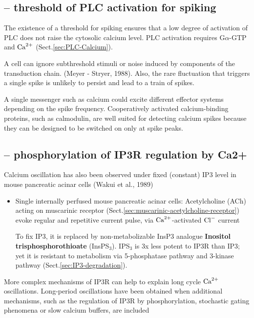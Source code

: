 \subsection{-- threshold of PLC activation for spiking}

The existence of a threshold for spiking ensures that a low degree of activation
of PLC does not raise the cytosolic calcium level.
PLC activation requires G$\alpha$-GTP and ${\text{Ca}^{2+}}$ (Sect.\ref{sec:PLC-Calcium}).

A cell can ignore subthreshold stimuli or noise induced by components of the
transduction chain. (Meyer - Stryer, 1988). Also, the rare fluctuation that
triggers a single spike is unlikely to persist and lead to a train of spikes.

A single messenger such as calcium could excite different effector systems
depending on the spike frequency. Cooperatively activated calcium-binding
proteins, such as calmodulin, are well suited for detecting calcium spikes
because they can be designed to be switched on only at spike peaks.




\subsection{-- phosphorylation of IP3R regulation by Ca2+}

Calcium oscillation has also been observed under fixed (constant) IP3 level
in mouse pancreatic acinar cells (Wakui et al., 1989)
\begin{itemize}
  \item Single internally perfused mouse pancreatic acinar cells: Acetylcholine
  (ACh) acting on muscarinic receptor
  (Sect.\ref{sec:muscarinic-acetylcholine-receptor}) evoke regular and
  repetitive current pulse, via ${\text{Ca}^{2+}}$-activated ${\text{Cl}^{-}}$ current
  
  To fix IP3, it is replaced by non-metabolizable InsP3 analogue {\bf Inositol
  trisphosphorothioate} (InsPS$_3$). IPS$_3$ is 3x less potent to IP3R than IP3;
  yet it is resistant to metabolism via 5-phosphatase pathway and 3-kinase
  pathway (Sect.\ref{sec:IP3-degradation}).
\end{itemize}


More complex mechanisms of IP3R can help to explain long cycle ${\text{Ca}^{2+}}$
oscillations. Long-period oscillations have been obtained when additional
mechanisms, such as the regulation of IP3R by phosphorylation, stochastic gating
phenomena or slow calcium buffers, are included

